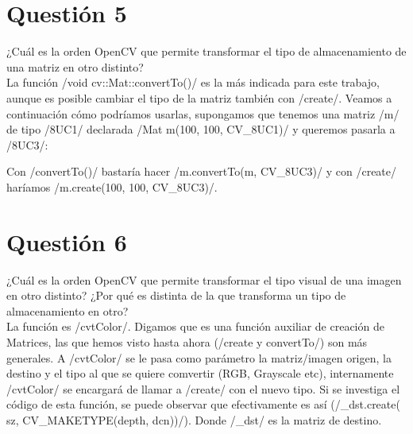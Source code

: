 \documentclass[	DIV=calc,%
							paper=a4,%
							fontsize=11pt]{scrartcl}	 					%
\newcommand{\miit}[1]{{\usefont{T1}{mdugm}{m}{it}\selectfont #1}}
\begin{document}
\section{Questión 5}

\miit{¿Cuál es la orden OpenCV que permite transformar el
tipo de almacenamiento de una matriz en otro distinto?}\\

La función \cppinline/void cv::Mat::convertTo()/ es la más indicada para este trabajo, aunque es posible cambiar el tipo de la matriz también con \cppinline/create/. Veamos a continuación cómo podríamos  usarlas, supongamos que tenemos una matriz \cppinline/m/ de tipo \cppinline/8UC1/ declarada \cppinline/Mat m(100, 100, CV_8UC1)/ y queremos pasarla a \cppinline/8UC3/:

Con \cppinline/convertTo()/ bastaría hacer \cppinline/m.convertTo(m, CV_8UC3)/ y con \cppinline/create/ haríamos \cppinline/m.create(100, 100, CV_8UC3)/.

\section{Questión 6}

\miit{¿Cuál es la orden OpenCV que permite transformar el
tipo visual de una imagen en otro distinto? ¿Por qué es
distinta de la que transforma un tipo de almacenamiento
en otro?}\\

La función es \cppinline/cvtColor/. Digamos que es una función auxiliar de creación de Matrices, las que hemos visto hasta ahora (\cppinline/create y convertTo/) son más generales. A \cppinline/cvtColor/ se le pasa como parámetro la matriz/imagen origen, la destino y el tipo al que se quiere comvertir (RGB, Grayscale etc), internamente \cppinline/cvtColor/ se encargará de llamar a \cppinline/create/ con el nuevo tipo. Si se investiga el código de esta función, se puede observar que efectivamente es así (\cppinline/_dst.create( sz, CV_MAKETYPE(depth, dcn))/). Donde \cppinline/_dst/ es la matriz de destino.
\end{document}
